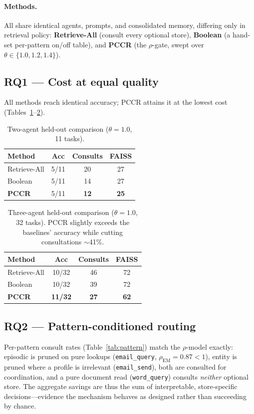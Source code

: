\documentclass[10pt,twocolumn]{article}
\newcommand{\code}[1]{\texttt{\small #1}}
\begin{document}
\paragraph{Methods.} All share identical agents, prompts, and consolidated memory,
differing only in retrieval policy: \textbf{Retrieve-All} (consult every optional
store), \textbf{Boolean} (a hand-set per-pattern on/off table), and \textbf{PCCR}
(the $\rho$-gate, swept over $\theta\in\{1.0,1.2,1.4\}$).

\subsection{RQ1 --- Cost at equal quality}
All methods reach identical accuracy; PCCR attains it at the lowest cost
(Tables~\ref{tab:cmp2}--\ref{tab:cmp3}).

\begin{table}[t]
\centering\small
\begin{tabular}{@{}lccc@{}}
\toprule
Method & Acc & Consults & FAISS \\
\midrule
Retrieve-All & 5/11 & 20 & 27 \\
Boolean      & 5/11 & 14 & 27 \\
\textbf{PCCR}& 5/11 & \textbf{12} & \textbf{25} \\
\bottomrule
\end{tabular}
\caption{Two-agent held-out comparison ($\theta{=}1.0$, 11 tasks).}
\label{tab:cmp2}
\end{table}

\begin{table}[t]
\centering\small
\begin{tabular}{@{}lccc@{}}
\toprule
Method & Acc & Consults & FAISS \\
\midrule
Retrieve-All & 10/32 & 46 & 72 \\
Boolean      & 10/32 & 39 & 72 \\
\textbf{PCCR}& \textbf{11/32} & \textbf{27} & \textbf{62} \\
\bottomrule
\end{tabular}
\caption{Three-agent held-out comparison ($\theta{=}1.0$, 32 tasks). PCCR
slightly exceeds the baselines' accuracy while cutting consultations $\sim$41\%.}
\label{tab:cmp3}
\end{table}

\subsection{RQ2 --- Pattern-conditioned routing}
Per-pattern consult rates (Table~\ref{tab:pattern}) match the $\rho$-model
exactly: episodic is pruned on pure lookups (\code{email\_query},
$\rho_{\text{EM}}{=}0.87{<}1$), entity is pruned where a profile is irrelevant
(\code{email\_send}), both are consulted for coordination, and a pure document
read (\code{word\_query}) consults \emph{neither} optional store. The aggregate
savings are thus the sum of interpretable, store-specific decisions---evidence the
mechanism behaves as designed rather than succeeding by chance.
\end{document}
